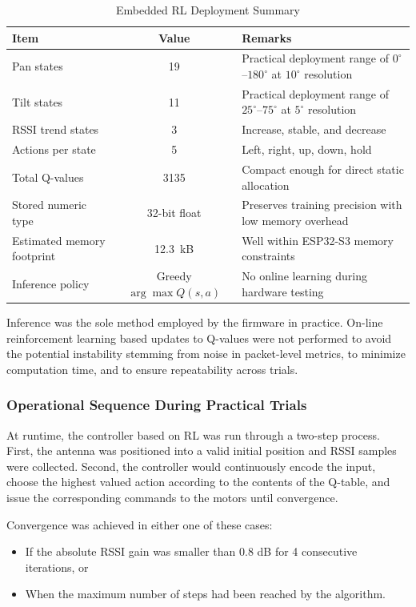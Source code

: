 \begin{table}[H]
\centering
\caption{Embedded RL Deployment Summary}
\label{tab:rl_deployment_summary}
\renewcommand{\arraystretch}{1.4}
\begin{tabular}{|p{3.6cm}|c|p{5.3cm}|}
\hline
\textbf{Item} & \textbf{Value} & \textbf{Remarks} \\
\hline
Pan states & 19 & Practical deployment range of $0^{\circ}$--$180^{\circ}$ at $10^{\circ}$ resolution \\
\hline
Tilt states & 11 & Practical deployment range of $25^{\circ}$--$75^{\circ}$ at $5^{\circ}$ resolution \\
\hline
RSSI trend states & 3 & Increase, stable, and decrease \\
\hline
Actions per state & 5 & Left, right, up, down, hold \\
\hline
Total Q-values & 3135 & Compact enough for direct static allocation \\
\hline
Stored numeric type & 32-bit float & Preserves training precision with low memory overhead \\
\hline
Estimated memory footprint & 12.3~kB & Well within ESP32-S3 memory constraints \\
\hline
Inference policy & Greedy $\arg\max Q(s,a)$ & No online learning during hardware testing \\
\hline
\end{tabular}
\end{table}

Inference was the sole method employed by the firmware in practice. On-line
reinforcement learning based updates to Q-values were not performed to avoid the potential
instability stemming from noise in packet-level metrics, to minimize computation time, and to
ensure repeatability across trials.

\subsubsection{Operational Sequence During Practical Trials}

At runtime, the controller based on RL was run through a two-step process.
First, the antenna was positioned into a valid initial position and RSSI samples were collected. Second,
the controller would continuously encode the input, choose the highest valued action according to the
contents of the Q-table, and issue the corresponding commands to the motors until convergence.

Convergence was achieved in either one of these cases:
\begin{itemize}
\item If the absolute RSSI gain was smaller than 0.8 dB for 4 consecutive iterations, or 
\item When the maximum number of steps had been reached by the algorithm.
\end{itemize}
